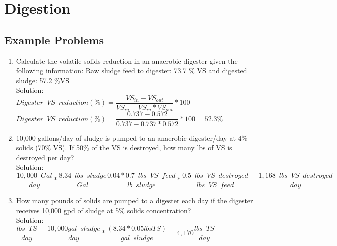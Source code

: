 \newpage

\section{Digestion}

\subsection{Example Problems} 

\begin{enumerate}

\item Calculate the volatile solids reduction in an anaerobic digester given the following information: Raw sludge feed to digester: 73.7 \% VS and digested sludge: 57.2 \%VS\\

Solution:\\
\vspace{0.5cm}
$Digester \enspace VS \enspace reduction (\%)=\dfrac{VS_{in}-VS_{out}}{VS_{in}-VS_{in}*VS_{out}}*100$\\
\vspace{0.5cm}
$Digester \enspace VS \enspace reduction (\%)=\dfrac{0.737-0.572}{0.737-0.737*0.572}*100=\boxed{ 52.3\%}$\\

\item 10,000 gallons/day of sludge is pumped to an anaerobic digester/day at 4\% solids (70\% VS).  If 50\% of the VS is destroyed, how many lbs of VS is destroyed per day?\\
Solution:\\
$\dfrac{10,000 \enspace Gal}{day}*\dfrac{8.34 \enspace lbs \enspace sludge}{Gal} \dfrac{0.04*0.7 \enspace lbs \enspace VS \enspace feed}{lb \enspace sludge}*\dfrac{0.5 \enspace lbs \enspace VS \enspace destroyed}{lbs \enspace VS \enspace feed}=\boxed{\dfrac{1,168 \enspace lbs \enspace VS \enspace destroyed}{day} } $

\item How many pounds of solids are pumped to a digester each day if the digester receives 10,000 gpd of sludge at 5\% solids concentration?\\

Solution:\\

{
$
	\dfrac{lbs \enspace TS}{day}
	=
	\dfrac{10,000 gal \enspace sludge}{day}
	*
	\dfrac{(8.34*0.05 lbs TS )}{gal \enspace sludge}
	=4,170
	\dfrac{lbs \enspace TS}{day}
$
}\\


\end{enumerate}
